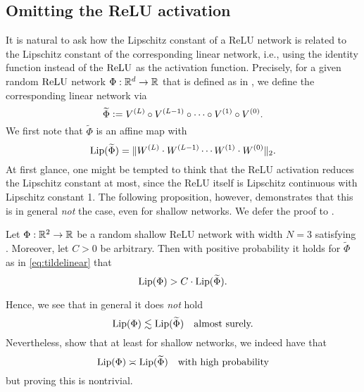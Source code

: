 \subsection{Omitting the ReLU activation}

It is natural to ask how the Lipschitz constant of a ReLU network is related to the Lipschitz constant of the corresponding linear network, i.e., using the identity function instead of the $\operatorname{ReLU}$ as the activation function.
Precisely, for a given random $\operatorname{ReLU}$ network $\Phi: \mathbb{R}^d \to \mathbb{R}$ that is defined as in , we define the corresponding linear network via
\begin{equation}\label{eq:tildelinear}
\widetilde{\Phi} \mathrel{\mathop:}= V^{(L)} \circ V^{(L-1)} \circ \cdots \circ  V^{(1)} \circ V^{(0)}.
\end{equation}
We first note that $\widetilde{\Phi}$ is an affine map with
\begin{equation*}
\operatorname{Lip}(\widetilde{\Phi}) = \Vert W^{(L)}\cdot W^{(L-1)} \cdots W^{(1)} \cdot W^{(0)}\Vert_2.
\end{equation*}
At first glance, one might be tempted to think that the ReLU activation reduces the Lipschitz constant at most, since the ReLU itself is Lipschitz continuous with Lipschitz constant 1. 
The following proposition, however, demonstrates that this is in general \emph{not} the case, even for shallow networks. We defer the proof to .
\begin{proposition}\label{prop:Cbound}
Let $\Phi: \mathbb{R}^2 \to \mathbb{R}$ be a random shallow ReLU network with width $N=3$ satisfying . 
Moreover, let $C>0$ be arbitrary.
Then with positive probability it holds for $\widetilde{\Phi}$ as in \eqref{eq:tildelinear} that
\begin{equation*}
\operatorname{Lip}(\Phi) > C \cdot \operatorname{Lip}(\widetilde{\Phi}).
\end{equation*}
\end{proposition}
Hence, we see that in general it does \emph{not} hold
\begin{equation*}
\operatorname{Lip}(\Phi) \lesssim \operatorname{Lip}(\widetilde{\Phi}) \quad \text{almost surely.}
\end{equation*}
Nevertheless,  show that at least for shallow networks, we indeed have that
\begin{equation*}
\operatorname{Lip}(\Phi) \asymp \operatorname{Lip}(\widetilde{\Phi}) \quad \text{with high probability}
\end{equation*} 
but proving this is nontrivial.


